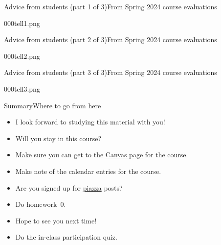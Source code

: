 \begin{frame}{Advice from students (part 1 of 3)}{From Spring 2024 course evaluations}

\Vskip{-4.1em}\begin{center}\begin{Pixture}[width=0.84\textwidth]{000}{tell1.png}  
\end{Pixture}\end{center}
    
\end{frame}

\begin{frame}{Advice from students (part 2 of 3)}{From Spring 2024 course evaluations}

\Vskip{-3.6em}\begin{center}\begin{Pixture}[width=0.95\textwidth]{000}{tell2.png}  
\end{Pixture}\end{center}
    
\end{frame}

\begin{frame}{Advice from students (part 3 of 3)}{From Spring 2024 course evaluations}

\Vskip{-3.6em}\begin{center}\begin{Pixture}[width=0.95\textwidth]{000}{tell3.png}  
\end{Pixture}\end{center}
    
\end{frame}

\begin{frame}{Summary}{Where to go from here}
\begin{itemize}
    \item I look forward to studying this material with you!
    \item Will you stay in this course? 
    \item Make sure you can get to the \href{\CourseWebPage}{Canvas page} for the course.
    \item Make note of the calendar entries for the course.
    \item Are you signed up for \href{https://piazza.com}{piazza} posts?
    \item Do homework~0.
    \item Hope to see you next time!
    \item Do the in-class participation quiz.
\end{itemize}
\end{frame}